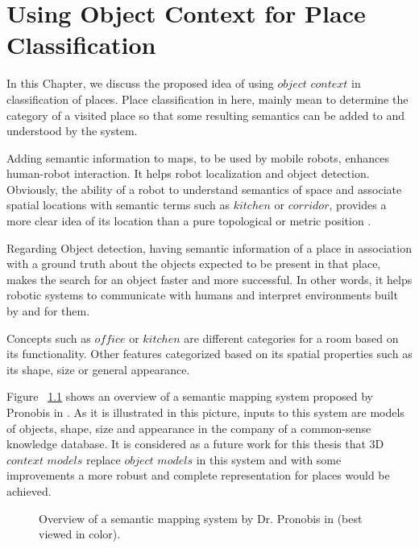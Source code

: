 \chapter{Using Object Context for Place Classification}
\label{UsingObjectContextforPlaceClassification.ch}

In this Chapter, we discuss the proposed idea of using $object$ $context$ in classification of places.
Place classification in here, mainly mean to determine the category of a visited place so that some resulting semantics 
can be added to and understood by the system.

Adding semantic information to maps, to be used by mobile robots, enhances human-robot interaction.
It helps robot localization and object detection.
Obviously, the ability of a robot to understand semantics of space and associate spatial locations with semantic terms 
such as $kitchen$ or $corridor$, provides a more clear idea of its location than a pure topological or metric position \cite{pronobis2011phd}.   

Regarding Object detection, having semantic information of a place in association with a ground truth about the objects expected
to be present in that place, makes the search for an object faster and more successful.
In other words, it helps robotic systems to communicate with humans and interpret environments built by and for them.

Concepts such as $office$ or $kitchen$ are different categories for a room based on its functionality.
Other features categorized based on its spatial properties such as its shape, size or general appearance.

Figure ~\ref{semanticmapping.figure} shows an overview of a semantic mapping system proposed by Pronobis in \cite{pronobis2011phd}.
As it is illustrated in this picture, inputs to this system are models of objects, shape, size and appearance in the company of a 
common-sense knowledge database.
It is considered as a future work for this thesis that 3D $context$ $models$ replace $object$ $models$ in this system and with some improvements 
a more robust and complete representation for places would be achieved.

\begin{figure}[t]
  \caption[Overview of a semantic mapping system]
  {Overview of a semantic mapping system by Dr. Pronobis in \cite{pronobis2011phd}(best viewed in color).}
  \label{semanticmapping.figure}
\end{figure}

